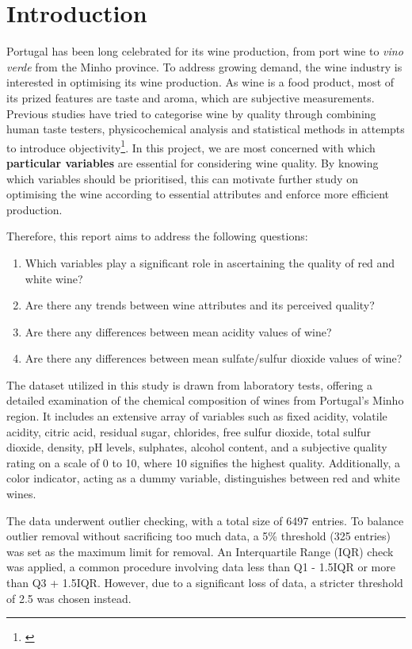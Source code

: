 \documentclass[
]{article}
\author{}
\date{\vspace{-2.5em}}
\providecommand{\tightlist}{%
  \setlength{\itemsep}{0pt}\setlength{\parskip}{0pt}}
\begin{document}
\section{Introduction}\label{introduction}

Portugal has been long celebrated for its wine production, from port
wine to \emph{vino verde} from the Minho province. To address growing
demand, the wine industry is interested in optimising its wine
production. As wine is a food product, most of its prized features are
taste and aroma, which are subjective measurements. Previous studies
have tried to categorise wine by quality through combining human taste
testers, physicochemical analysis and statistical methods in attempts to
introduce objectivity\footnote{\textcite{RN1}}. In this project, we are
most concerned with which \textbf{particular variables} are essential
for considering wine quality. By knowing which variables should be
prioritised, this can motivate further study on optimising the wine
according to essential attributes and enforce more efficient production.

Therefore, this report aims to address the following questions:

\begin{enumerate}
\def\labelenumi{\arabic{enumi}.}
\tightlist
\item
  Which variables play a significant role in ascertaining the quality of
  red and white wine?
\item
  Are there any trends between wine attributes and its perceived
  quality?
\item
  Are there any differences between mean acidity values of wine?
\item
  Are there any differences between mean sulfate/sulfur dioxide values
  of wine?
\end{enumerate}

The dataset utilized in this study is drawn from laboratory tests,
offering a detailed examination of the chemical composition of wines
from Portugal's Minho region. It includes an extensive array of
variables such as fixed acidity, volatile acidity, citric acid, residual
sugar, chlorides, free sulfur dioxide, total sulfur dioxide, density, pH
levels, sulphates, alcohol content, and a subjective quality rating on a
scale of 0 to 10, where 10 signifies the highest quality. Additionally,
a color indicator, acting as a dummy variable, distinguishes between red
and white wines.

The data underwent outlier checking, with a total size of 6497 entries.
To balance outlier removal without sacrificing too much data, a 5\%
threshold (325 entries) was set as the maximum limit for removal. An
Interquartile Range (IQR) check was applied, a common procedure
involving data less than Q1 - 1.5IQR or more than Q3 + 1.5IQR. However,
due to a significant loss of data, a stricter threshold of 2.5 was
chosen instead.
\end{document}
